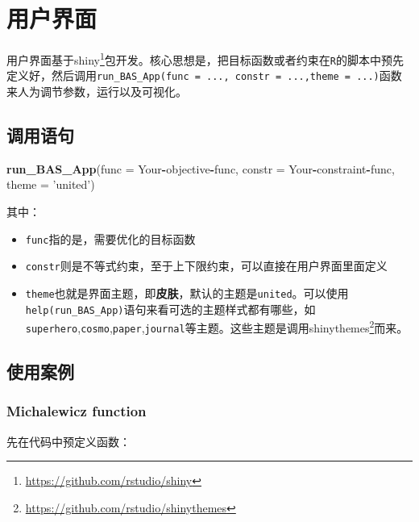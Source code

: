\documentclass[]{ctexbook}
\newenvironment{Shaded}{\begin{snugshade}}{\end{snugshade}}
\newcommand{\KeywordTok}[1]{\textcolor[rgb]{0.13,0.29,0.53}{\textbf{#1}}}
\newcommand{\DataTypeTok}[1]{\textcolor[rgb]{0.13,0.29,0.53}{#1}}
\newcommand{\StringTok}[1]{\textcolor[rgb]{0.31,0.60,0.02}{#1}}
\newcommand{\OperatorTok}[1]{\textcolor[rgb]{0.81,0.36,0.00}{\textbf{#1}}}
\newcommand{\NormalTok}[1]{#1}
\renewcommand{\href}[2]{#2\footnote{\url{#1}}}
\begin{document}
\chapter{用户界面}\label{interface}

用户界面基于\href{https://github.com/rstudio/shiny}{shiny}包开发。核心思想是，把目标函数或者约束在\texttt{R}的脚本中预先定义好，然后调用\texttt{run\_BAS\_App(func\ =\ ...,\ constr\ =\ ...,theme\ =\ ...)}函数来人为调节参数，运行以及可视化。

\section{调用语句}

\begin{Shaded}
\begin{Highlighting}[]
\KeywordTok{run_BAS_App}\NormalTok{(}\DataTypeTok{func =}\NormalTok{ Your}\OperatorTok{-}\NormalTok{objective}\OperatorTok{-}\NormalTok{func,}
            \DataTypeTok{constr =}\NormalTok{ Your}\OperatorTok{-}\NormalTok{constraint}\OperatorTok{-}\NormalTok{func,}
            \DataTypeTok{theme =} \StringTok{'united'}\NormalTok{)}
\end{Highlighting}
\end{Shaded}

其中：

\begin{itemize}
\item
  \texttt{func}指的是，需要优化的目标函数
\item
  \texttt{constr}则是不等式约束，至于上下限约束，可以直接在用户界面里面定义
\item
  \texttt{theme}也就是界面主题，即\textbf{皮肤}，默认的主题是\texttt{united}。可以使用\texttt{help(run\_BAS\_App)}语句来看可选的主题样式都有哪些，如\texttt{superhero},\texttt{cosmo},\texttt{paper},\texttt{journal}等主题。这些主题是调用\href{https://github.com/rstudio/shinythemes}{shinythemes}而来。
\end{itemize}

\section{使用案例}

\subsection{Michalewicz function}\label{michalewicz-function-2}

先在代码中预定义函数：
\end{document}
